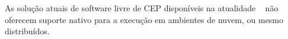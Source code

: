 



As solução atuais de software livre de CEP disponíveis na atualidade ~\cite{Esper,DroolsFusion,WSO2CEP} %
não oferecem suporte nativo para a execução em ambientes de nuvem, ou mesmo distribuídos.

